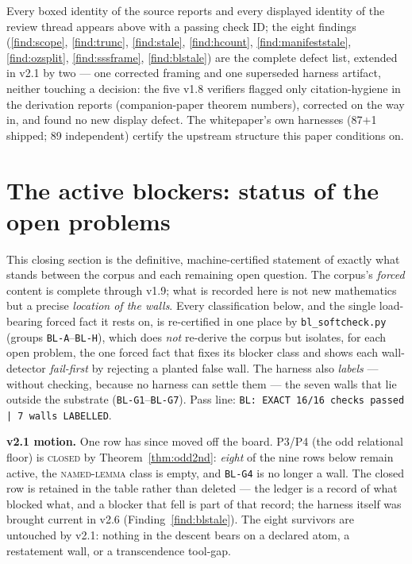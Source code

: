 \documentclass[11pt]{article}
\newcommand{\hx}[1]{\textcolor{cC}{\footnotesize\texttt{#1}}}
\theoremstyle{plain}
\theoremstyle{definition}
\theoremstyle{remark}
\begin{document}
\smallskip\noindent
Every boxed identity of the source reports and every displayed identity of the
review thread appears above with a passing check ID; the eight findings
(\ref{find:scope}, \ref{find:trunc}, \ref{find:stale}, \ref{find:hcount},
\ref{find:manifeststale}, \ref{find:ozsplit}, \ref{find:sssframe},
\ref{find:blstale})
are the complete defect list, extended in v2.1 by two --- one corrected framing
and one superseded harness artifact, neither touching a decision: the five v1.8 verifiers
flagged only citation-hygiene in the derivation reports (companion-paper
theorem numbers), corrected on the way in, and found no new display defect. The
whitepaper's own harnesses (87$+$1 shipped; 89 independent) certify the upstream
structure this paper conditions on.

\section{The active blockers: status of the open problems}\label{sec:blockers}

This closing section is the definitive, machine-certified statement of exactly
what stands between the corpus and each remaining open question. The corpus's
\emph{forced} content is complete through v1.9; what is recorded here is not new
mathematics but a precise \emph{location of the walls}. Every classification
below, and the single load-bearing forced fact it rests on, is re-certified in
one place by \texttt{bl\_softcheck.py} (groups \hx{BL-A}--\hx{BL-H}), which does
\emph{not} re-derive the corpus but isolates, for each open problem, the one
forced fact that fixes its blocker class and shows each wall-detector
\emph{fail-first} by rejecting a planted false wall. The harness also
\emph{labels} --- without checking, because no harness can settle them --- the
seven walls that lie outside the substrate (\hx{BL-G1}--\hx{BL-G7}). Pass line:
\texttt{BL: EXACT 16/16 checks passed | 7 walls LABELLED}.

\smallskip\noindent
\textbf{v2.1 motion.} One row has since moved off the board. P3/P4 (the odd
relational floor) is \textsc{closed} by Theorem~\ref{thm:odd2nd}: \emph{eight}
of the nine rows below remain active, the \textsc{named-lemma} class is empty,
and \hx{BL-G4} is no longer a wall. The closed row is retained in the table
rather than deleted --- the ledger is a record of what blocked what, and a
blocker that fell is part of that record; the harness itself was brought current
in v2.6 (Finding~\ref{find:blstale}).
The eight survivors are untouched by v2.1: nothing in the descent bears on a
declared atom, a restatement wall, or a transcendence tool-gap.
\end{document}

